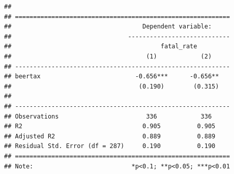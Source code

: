 \documentclass[]{book}
\newenvironment{Shaded}{\begin{snugshade}}{\end{snugshade}}
\newcommand{\KeywordTok}[1]{\textcolor[rgb]{0.13,0.29,0.53}{\textbf{#1}}}
\newcommand{\DataTypeTok}[1]{\textcolor[rgb]{0.13,0.29,0.53}{#1}}
\newcommand{\DecValTok}[1]{\textcolor[rgb]{0.00,0.00,0.81}{#1}}
\newcommand{\StringTok}[1]{\textcolor[rgb]{0.31,0.60,0.02}{#1}}
\newcommand{\CommentTok}[1]{\textcolor[rgb]{0.56,0.35,0.01}{\textit{#1}}}
\newcommand{\OtherTok}[1]{\textcolor[rgb]{0.56,0.35,0.01}{#1}}
\newcommand{\OperatorTok}[1]{\textcolor[rgb]{0.81,0.36,0.00}{\textbf{#1}}}
\newcommand{\NormalTok}[1]{#1}
\begin{document}
\begin{Shaded}
\end{Shaded}

\begin{verbatim}
## 
## ===========================================================
##                                    Dependent variable:     
##                                ----------------------------
##                                         fatal_rate         
##                                     (1)            (2)     
## -----------------------------------------------------------
## beertax                          -0.656***      -0.656**   
##                                   (0.190)        (0.315)   
##                                                            
## -----------------------------------------------------------
## Observations                        336            336     
## R2                                 0.905          0.905    
## Adjusted R2                        0.889          0.889    
## Residual Std. Error (df = 287)     0.190          0.190    
## ===========================================================
## Note:                           *p<0.1; **p<0.05; ***p<0.01
\end{verbatim}
\end{document}
